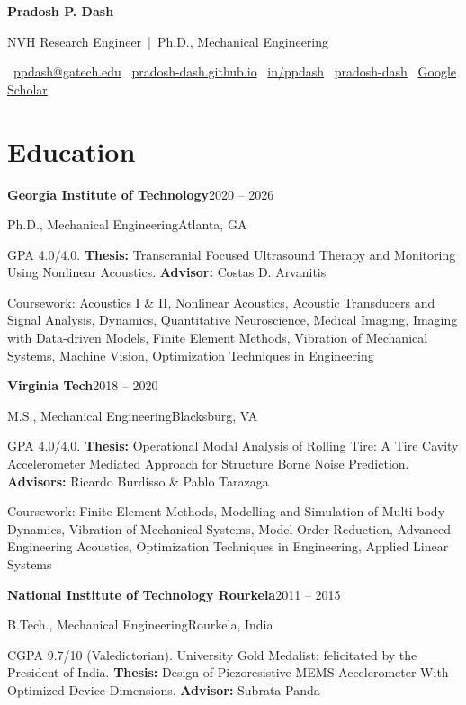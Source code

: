 \documentclass[10pt,letterpaper]{article}
\newcommand{\entry}[4]{%
  {\textbf{\color{navy}#1}\hfill{\color{muted}\small #2}\par}%
  {{\color{accent}#3}\hfill{\color{muted}\small #4}\par}\vspace{2pt}}
\newcommand{\detail}[1]{{\small #1}\par}
\newcommand{\gap}{\vspace{7pt}}
\begin{document}
{\centering
  {\fontsize{24}{28}\selectfont\bfseries\color{navy} Pradosh P. Dash}\par\vspace{3pt}
  {\color{accent} NVH Research Engineer \,|\, Ph.D., Mechanical Engineering}\par\vspace{5pt}
  {\small\color{muted}
    \faEnvelope\ \href{mailto:ppdash@gatech.edu}{ppdash@gatech.edu} \quad
    \faGlobe\ \href{https://pradosh-dash.github.io}{pradosh-dash.github.io} \quad
    \faLinkedin\ \href{https://www.linkedin.com/in/ppdash}{in/ppdash} \quad
    \faGithub\ \href{https://github.com/pradosh-dash}{pradosh-dash} \quad
    \faGraduationCap\ \href{https://scholar.google.com/citations?user=us9GO_wAAAAJ}{Google Scholar}}\par
}

\section{Education}

\entry{Georgia Institute of Technology}{2020 -- 2026}{Ph.D., Mechanical Engineering}{Atlanta, GA}
\detail{GPA 4.0/4.0. \textbf{Thesis:} Transcranial Focused Ultrasound Therapy and Monitoring Using Nonlinear Acoustics. \textbf{Advisor:} Costas D. Arvanitis}
\detail{\color{muted}Coursework: Acoustics I \& II, Nonlinear Acoustics, Acoustic Transducers and Signal Analysis, Dynamics, Quantitative Neuroscience, Medical Imaging, Imaging with Data-driven Models, Finite Element Methods, Vibration of Mechanical Systems, Machine Vision, Optimization Techniques in Engineering}
\gap

\entry{Virginia Tech}{2018 -- 2020}{M.S., Mechanical Engineering}{Blacksburg, VA}
\detail{GPA 4.0/4.0. \textbf{Thesis:} Operational Modal Analysis of Rolling Tire: A Tire Cavity Accelerometer Mediated Approach for Structure Borne Noise Prediction. \textbf{Advisors:} Ricardo Burdisso \& Pablo Tarazaga}
\detail{\color{muted}Coursework: Finite Element Methods, Modelling and Simulation of Multi-body Dynamics, Vibration of Mechanical Systems, Model Order Reduction, Advanced Engineering Acoustics, Optimization Techniques in Engineering, Applied Linear Systems}
\gap

\entry{National Institute of Technology Rourkela}{2011 -- 2015}{B.Tech., Mechanical Engineering}{Rourkela, India}
\detail{CGPA 9.7/10 (Valedictorian). University Gold Medalist; felicitated by the President of India. \textbf{Thesis:} Design of Piezoresistive MEMS Accelerometer With Optimized Device Dimensions. \textbf{Advisor:} Subrata Panda}
\end{document}
